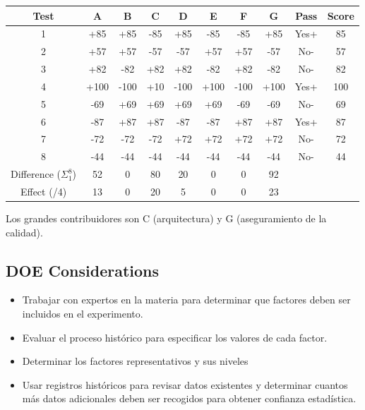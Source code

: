 \documentclass[]{article}
\begin{document}
\begin{table}[H]
	\begin{center}
		\begin{tabular}{|c|c|c|c|c|c|c|c|c|c|}
			\hline Test & A & B & C & D & E & F & G & Pass & Score \\
			\hline 1 & +85 & +85 & -85 & +85 & -85 & -85 & +85 & Yes+& 85 \\
			\hline 2 & +57 & +57 & -57 & -57 & +57 & +57 & -57 & No- & 57 \\
			\hline 3 & +82 & -82 & +82 & +82 & -82 & +82 & -82 & No- & 82 \\
			\hline 4 & +100 & -100 & +10 & -100 & +100 & -100 & +100 & Yes+& 100 \\
			\hline 5 & -69 & +69 & +69 & +69 & +69 & -69 & -69 & No- & 69 \\
			\hline 6 & -87 & +87 & +87 & -87 & -87 & +87 & +87 & Yes+& 87 \\
			\hline 7 & -72 & -72 & -72 & +72 & +72& +72 & +72 & No- & 72 \\
			\hline 8 & -44 & -44 & -44 & -44 & -44 & -44 & -44 & No- & 44 \\
			\hline 
			\hline Difference ($\Sigma_1^8$) & 52 & 0 & 80 & 20 & 0 & 0 & 92 &  &  \\
			\hline Effect (/4) & 13 & 0 & 20 & 5 & 0 & 0 & 23 & & \\
			\hline
		\end{tabular}
	\end{center}
\end{table}

Los grandes contribuidores son C (arquitectura) y G (aseguramiento de la calidad).

\subsection{DOE Considerations}

\begin{itemize}
	\item Trabajar con expertos en la materia para determinar que factores deben ser incluidos en el experimento.
	\item Evaluar el proceso histórico para especificar los valores de cada factor.
	\item Determinar los factores representativos y sus niveles
	\item Usar registros históricos para revisar datos existentes y determinar cuantos más datos adicionales deben ser recogidos para obtener confianza estadística.
\end{itemize}
\end{document}
